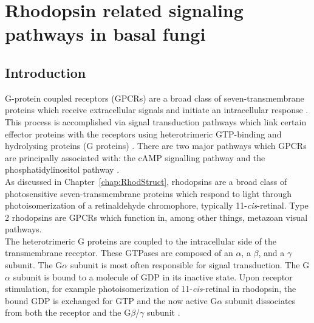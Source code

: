\chapter{Rhodopsin related signaling pathways in basal fungi}
\label{chap:RhodAux}
\section{Introduction}
\indent G-protein coupled receptors (GPCRs) are a broad class of seven-transmembrane proteins which receive extracellular signals and initiate an intracellular response \cite{Lagerstrom2008}. This process is accomplished via signal transduction pathways which link certain effector proteins with the receptors using heterotrimeric GTP-binding and hydrolysing proteins (G proteins) \cite{Hepler1992}. There are two major pathways which GPCRs are principally associated with: the cAMP signalling pathway and the phosphatidylinositol pathway \cite{Gilman1987}.\\
\indent As discussed in Chapter~\ref{chap:RhodStruct}, rhodopsins are a broad class of photosensitive seven-transmembrane proteins which respond to light through photoisomerization of a retinaldehyde chromophore, typically 11-\textit{cis}-retinal. Type 2 rhodopsins are GPCRs which function in, among other things, metazoan visual pathways.\\
\indent The heterotrimeric G proteins are coupled to the intracellular side of the transmembrane receptor. These GTPases are composed of an $\alpha$, a $\beta$, and a $\gamma$ subunit. The G$\alpha$ subunit is most often responsible for signal transduction. The G$\alpha$ subunit is bound to a molecule of GDP in its inactive state. Upon receptor stimulation, for example photoisomerization of 11-\textit{cis}-retinal in rhodopsin, the bound GDP is exchanged for GTP and the now active G$\alpha$ subunit dissociates from both the receptor and the G$\beta$/$\gamma$ subunit \cite{Neves2002}.\\ 
